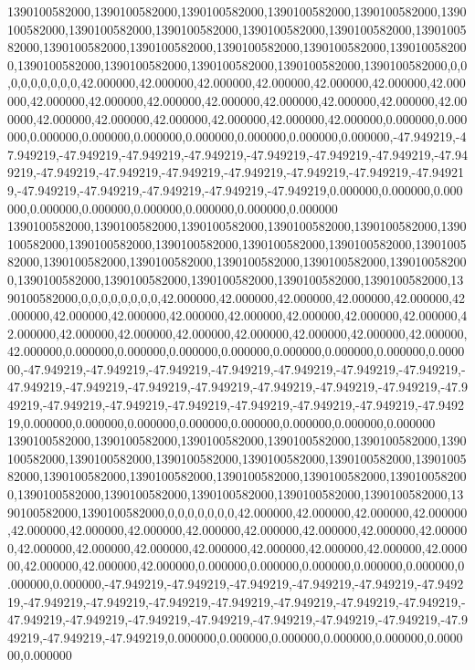 1390100582000,1390100582000,1390100582000,1390100582000,1390100582000,1390100582000,1390100582000,1390100582000,1390100582000,1390100582000,1390100582000,1390100582000,1390100582000,1390100582000,1390100582000,1390100582000,1390100582000,1390100582000,1390100582000,1390100582000,1390100582000,0,0,0,0,0,0,0,0,0,42.000000,42.000000,42.000000,42.000000,42.000000,42.000000,42.000000,42.000000,42.000000,42.000000,42.000000,42.000000,42.000000,42.000000,42.000000,42.000000,42.000000,42.000000,42.000000,42.000000,42.000000,0.000000,0.000000,0.000000,0.000000,0.000000,0.000000,0.000000,0.000000,0.000000,-47.949219,-47.949219,-47.949219,-47.949219,-47.949219,-47.949219,-47.949219,-47.949219,-47.949219,-47.949219,-47.949219,-47.949219,-47.949219,-47.949219,-47.949219,-47.949219,-47.949219,-47.949219,-47.949219,-47.949219,-47.949219,0.000000,0.000000,0.000000,0.000000,0.000000,0.000000,0.000000,0.000000,0.000000
1390100582000,1390100582000,1390100582000,1390100582000,1390100582000,1390100582000,1390100582000,1390100582000,1390100582000,1390100582000,1390100582000,1390100582000,1390100582000,1390100582000,1390100582000,1390100582000,1390100582000,1390100582000,1390100582000,1390100582000,1390100582000,1390100582000,0,0,0,0,0,0,0,0,42.000000,42.000000,42.000000,42.000000,42.000000,42.000000,42.000000,42.000000,42.000000,42.000000,42.000000,42.000000,42.000000,42.000000,42.000000,42.000000,42.000000,42.000000,42.000000,42.000000,42.000000,42.000000,0.000000,0.000000,0.000000,0.000000,0.000000,0.000000,0.000000,0.000000,-47.949219,-47.949219,-47.949219,-47.949219,-47.949219,-47.949219,-47.949219,-47.949219,-47.949219,-47.949219,-47.949219,-47.949219,-47.949219,-47.949219,-47.949219,-47.949219,-47.949219,-47.949219,-47.949219,-47.949219,-47.949219,-47.949219,0.000000,0.000000,0.000000,0.000000,0.000000,0.000000,0.000000,0.000000
1390100582000,1390100582000,1390100582000,1390100582000,1390100582000,1390100582000,1390100582000,1390100582000,1390100582000,1390100582000,1390100582000,1390100582000,1390100582000,1390100582000,1390100582000,1390100582000,1390100582000,1390100582000,1390100582000,1390100582000,1390100582000,1390100582000,1390100582000,0,0,0,0,0,0,0,42.000000,42.000000,42.000000,42.000000,42.000000,42.000000,42.000000,42.000000,42.000000,42.000000,42.000000,42.000000,42.000000,42.000000,42.000000,42.000000,42.000000,42.000000,42.000000,42.000000,42.000000,42.000000,42.000000,0.000000,0.000000,0.000000,0.000000,0.000000,0.000000,0.000000,-47.949219,-47.949219,-47.949219,-47.949219,-47.949219,-47.949219,-47.949219,-47.949219,-47.949219,-47.949219,-47.949219,-47.949219,-47.949219,-47.949219,-47.949219,-47.949219,-47.949219,-47.949219,-47.949219,-47.949219,-47.949219,-47.949219,-47.949219,0.000000,0.000000,0.000000,0.000000,0.000000,0.000000,0.000000
